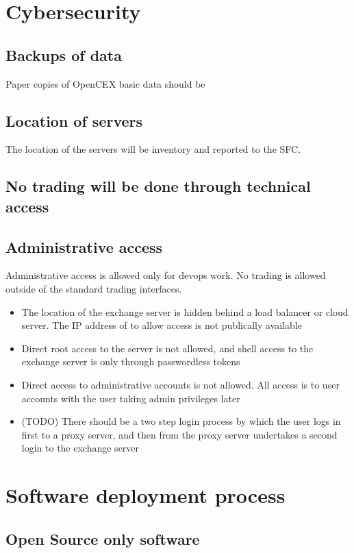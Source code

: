\section{Cybersecurity}

\subsection{Backups of data}
Paper copies of OpenCEX basic data should be    

\subsection{Location of servers}
The location of the servers will be inventory and reported to the SFC.

\subsection{No trading will be done through technical access}


\subsection{Administrative access}
Administrative access is allowed only for devops work.  No trading is
allowed outside of the standard trading interfaces.

\begin{itemize}
\item The location of the exchange server is hidden behind a load
  balancer or cloud server.  The IP address of to allow access is not
  publically available
\item Direct root access to the server is not allowed, and shell access to
  the exchange server is only through passwordless tokens
\item Direct access to administrative accounts is not allowed.  All
  access is to user accounts with the user taking admin privileges later
\item (TODO) There should be a two step login process by which the
  user logs in first to a proxy server, and then from the proxy server
  undertakes a second login to the exchange server
\end{itemize}

\section{Software deployment process}
\subsection{Open Source only software}

